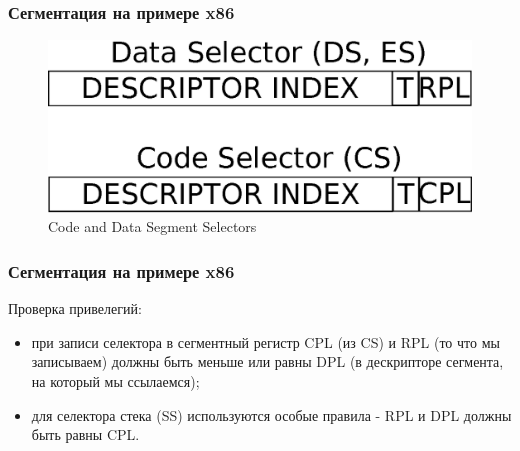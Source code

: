 \begin{frame}
\frametitle{Сегментация на примере x86}

\begin{figure}
  \centering\includegraphics[width=.9\linewidth]{arch-segs}
  \caption{Code and Data Segment Selectors}
\end{figure}

\end{frame}

\begin{frame}
\frametitle{Сегментация на примере x86}

Проверка привелегий:
\begin{itemize}
  \item при записи селектора в сегментный регистр CPL (из CS) и RPL (то что мы записываем) должны быть меньше или равны DPL (в дескрипторе сегмента, на который мы ссылаемся);
  \item для селектора стека (SS) используются особые правила - RPL и DPL должны быть равны CPL.
\end{itemize}
\end{frame}
